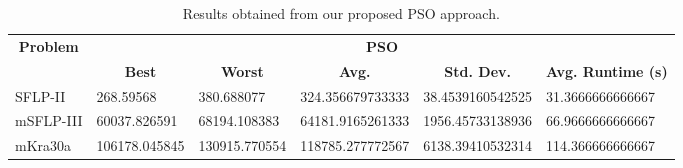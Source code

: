 \begin{table}[h!]
\begin{adjustwidth}{-1.18in}{}
\centering
\begin{tabular}{|l|l|l|l|l|l|}
	\hline
	\multicolumn{1}{|c|}{\multirow{2}{*}{\textbf{Problem}}} & \multicolumn{5}{c|}{\textbf{PSO}} \\ \cline{2-6} 
	\multicolumn{1}{|c|}{}                                  & \multicolumn{1}{c|}{\textbf{Best}} & \multicolumn{1}{c|}{\textbf{Worst}} & \multicolumn{1}{c|}{\textbf{Avg.}} & \multicolumn{1}{c|}{\textbf{Std. Dev.}} & \multicolumn{1}{c|}{\textbf{Avg. Runtime (s)}} \\ \hline
	SFLP-II                                                 & 268.59568                                  & 380.688077                                   &
	324.356679733333							&
	38.4539160542525							&
	31.3666666666667							\\ \hline
	mSFLP-III                                               & 60037.826591                                & 68194.108383                                 &
	64181.9165261333					          &
	1956.45733138936						&
	66.9666666666667						\\ \hline
	mKra30a                                               & 106178.045845                                & 130915.770554                                 &
	118785.277772567							&
	6138.39410532314							&
	114.366666666667						\\ \hline
\end{tabular}
\end{adjustwidth}
\caption{Results obtained from our proposed PSO approach.}
\label{approach-pso-results}
\end{table}

